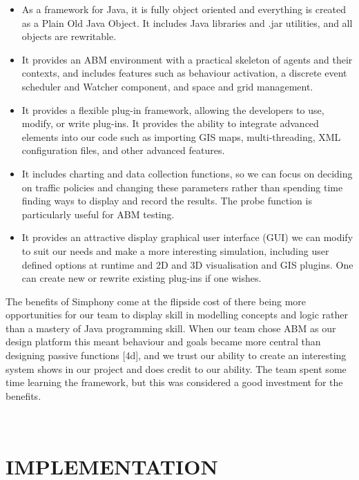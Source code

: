 \documentclass[11pt]{article}
\begin{document}
\begin{itemize}\itemsep0pt
\item As a framework for Java, it is fully object oriented and everything is created as a Plain Old Java Object. It includes Java libraries and .jar utilities, and all objects are rewritable.
\\
\item It provides an ABM environment with a practical skeleton of agents and their contexts, and includes features such as behaviour activation, a discrete event scheduler and Watcher component, and space and grid management.
\\
\item It provides a flexible plug-in framework, allowing the developers to use, modify, or write plug-ins. It provides the ability to integrate advanced elements into our code such as importing GIS maps, multi-threading, XML configuration files, and other advanced features.
\\
\item It includes charting and data collection functions, so we can focus on deciding on traffic policies and changing these parameters rather than spending time finding ways to display and record the results. The probe function is particularly useful for ABM testing.
\\
\item It provides an attractive display graphical user interface (GUI) we can modify to suit our needs and make a more interesting simulation, including user defined options at runtime and 2D and 3D visualisation and GIS plugins. One can create new or rewrite existing plug-ins if one wishes.
\end {itemize}

The benefits of Simphony come at the flipside cost of there being more opportunities for our team to display skill in modelling concepts and logic rather than a mastery of Java programming skill. When our team chose ABM as our design platform this meant behaviour and goals became more central than designing passive functions [4d], and we trust our ability to create an interesting system shows in our project and does credit to our ability. The team spent some time learning the framework, but this was considered a good investment for the benefits.

\\ 

\section{IMPLEMENTATION}
\end{document}
